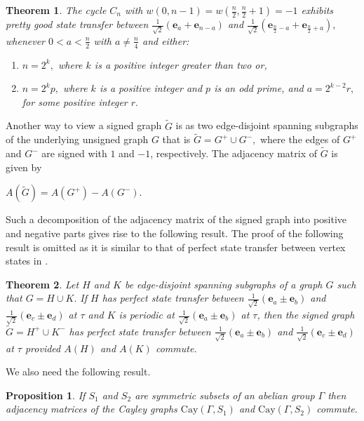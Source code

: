 \documentclass[12pt,a4paper]{article}
\newtheorem{thm}{Theorem}
\newtheorem{prop}{Proposition}
\def \e {{\bf e}}
\def \e {{\mathbf e}}
\newcommand{\ob}[1]{\left(#1\right)}
\begin{document}
\begin{thm}
The cycle $C_n$ with $w\ob{0,n-1}=w\ob{\frac{n}{2},\frac{n}{2}+1}=-1$ exhibits pretty good state transfer between $\frac{1}{\sqrt2}(\e_a+\e_{n-a})$ and $\frac{1}{\sqrt2}(\e_{\frac{n}{2}-a}+\e_{\frac{n}{2}+a}),$ whenever $0<a<\frac{n}{2}$ with $a\neq\frac{n}{4}$ and either:
    \begin{enumerate}
    \item $n = 2^{k},$ where $k$ is a positive integer greater than two or,
    \item $n=2^k p,$ where $k$ is a positive integer and $p$ is an odd prime, and $a=2^{k-2}r,$ for some positive integer $r.$
    \end{enumerate}   
\end{thm}

Another way to view a signed graph $\tilde{G}$ is as two edge-disjoint spanning subgraphs of the underlying unsigned graph $G$ that is $\tilde{G}=G^+\cup G^-,$ where the edges of $G^+$ and $G^-$ are signed with $1$ and $-1$, respectively. The adjacency matrix of $\tilde{G}$ is given by
\begin{center}
$A\ob{\tilde{G}}=A\ob{G^+} - A\ob{G^-}$.
\end{center}
Such a decomposition of the adjacency matrix of the signed graph into positive and negative parts gives rise to the following result. The proof of the following result is omitted as it is similar to that of
perfect state transfer between vertex states in \cite[Theorem 2]{brow}. 

\begin{thm}\label{3t10}
Let $H$ and $K$ be edge-disjoint spanning subgraphs of a graph $G$ such that $G=H\cup K.$ If $H$ has perfect state transfer between $\frac{1}{\sqrt2}(\e_a\pm\e_b)$ and $\frac{1}{\sqrt2}(\e_c\pm\e_d)$ at $\tau$ and $K$ is periodic at $\frac{1}{\sqrt2}(\e_a\pm\e_b)$ at $\tau$, then the signed graph $\tilde{G}=H^+\cup K^-$ has perfect state transfer between $\frac{1}{\sqrt2}(\e_a\pm\e_b)$ and $\frac{1}{\sqrt2}(\e_c\pm\e_d)$ at $\tau$ provided $A(H)$ and $A(K)$ commute. 
\end{thm}

We also need the following result.

\begin{prop}\label{3p2}\cite{pal6}
If $S_1$ and $S_2$ are symmetric subsets of an abelian group $\Gamma$ then adjacency matrices of the Cayley graphs $\text{Cay}\ob{\Gamma, S_1}$ and $\text{Cay}\ob{\Gamma , S_2}$ commute.
\end{prop}
\end{document}
